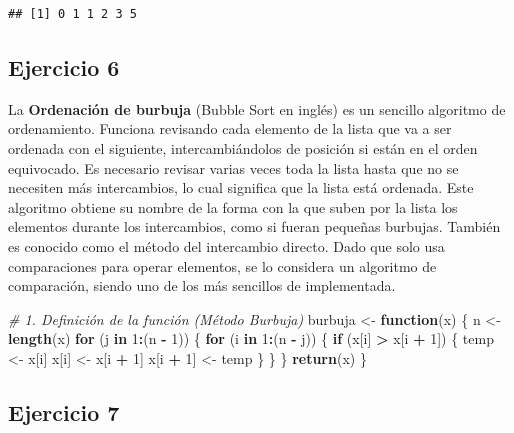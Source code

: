 \documentclass[runningheads]{llncs}
\newenvironment{Shaded}{\begin{snugshade}}{\end{snugshade}}
\newcommand{\CommentTok}[1]{\textcolor[rgb]{0.56,0.35,0.01}{\textit{#1}}}
\newcommand{\ControlFlowTok}[1]{\textcolor[rgb]{0.13,0.29,0.53}{\textbf{#1}}}
\newcommand{\DecValTok}[1]{\textcolor[rgb]{0.00,0.00,0.81}{#1}}
\newcommand{\FunctionTok}[1]{\textcolor[rgb]{0.13,0.29,0.53}{\textbf{#1}}}
\newcommand{\NormalTok}[1]{#1}
\newcommand{\OtherTok}[1]{\textcolor[rgb]{0.56,0.35,0.01}{#1}}
\newcommand{\SpecialCharTok}[1]{\textcolor[rgb]{0.81,0.36,0.00}{\textbf{#1}}}
\begin{document}
\begin{verbatim}
## [1] 0 1 1 2 3 5
\end{verbatim}

\subsection{Ejercicio 6}\label{ejercicio-6}

La \textbf{Ordenación de burbuja} (Bubble Sort en inglés) es un sencillo
algoritmo de ordenamiento. Funciona revisando cada elemento de la lista
que va a ser ordenada con el siguiente, intercambiándolos de posición si
están en el orden equivocado. Es necesario revisar varias veces toda la
lista hasta que no se necesiten más intercambios, lo cual significa que
la lista está ordenada. Este algoritmo obtiene su nombre de la forma con
la que suben por la lista los elementos durante los intercambios, como
si fueran pequeñas burbujas. También es conocido como el método del
intercambio directo. Dado que solo usa comparaciones para operar
elementos, se lo considera un algoritmo de comparación, siendo uno de
los más sencillos de implementada.

\begin{Shaded}
\begin{Highlighting}[]
\CommentTok{\# 1. Definición de la función (Método Burbuja)}
\NormalTok{burbuja }\OtherTok{\textless{}{-}} \ControlFlowTok{function}\NormalTok{(x) \{}
\NormalTok{  n }\OtherTok{\textless{}{-}} \FunctionTok{length}\NormalTok{(x)}
  \ControlFlowTok{for}\NormalTok{ (j }\ControlFlowTok{in} \DecValTok{1}\SpecialCharTok{:}\NormalTok{(n }\SpecialCharTok{{-}} \DecValTok{1}\NormalTok{)) \{}
    \ControlFlowTok{for}\NormalTok{ (i }\ControlFlowTok{in} \DecValTok{1}\SpecialCharTok{:}\NormalTok{(n }\SpecialCharTok{{-}}\NormalTok{ j)) \{}
      \ControlFlowTok{if}\NormalTok{ (x[i] }\SpecialCharTok{\textgreater{}}\NormalTok{ x[i }\SpecialCharTok{+} \DecValTok{1}\NormalTok{]) \{}
\NormalTok{        temp }\OtherTok{\textless{}{-}}\NormalTok{ x[i]}
\NormalTok{        x[i] }\OtherTok{\textless{}{-}}\NormalTok{ x[i }\SpecialCharTok{+} \DecValTok{1}\NormalTok{]}
\NormalTok{        x[i }\SpecialCharTok{+} \DecValTok{1}\NormalTok{] }\OtherTok{\textless{}{-}}\NormalTok{ temp}
\NormalTok{      \}}
\NormalTok{    \}}
\NormalTok{  \}}
  \FunctionTok{return}\NormalTok{(x)}
\NormalTok{\}}
\end{Highlighting}
\end{Shaded}

\subsection{Ejercicio 7}\label{ejercicio-7}
\end{document}

